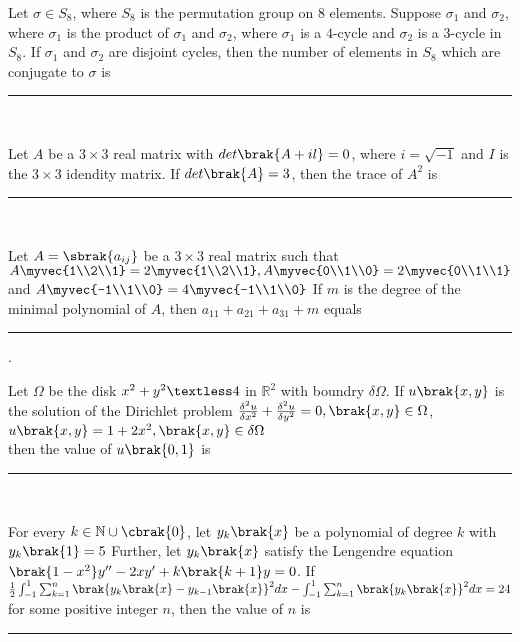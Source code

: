 \item{
Let $\sigma\in S_8$, where $S_8$ is the permutation group on $8$ elements. Suppose $\sigma_1$ and $\sigma_2$, where $\sigma_1$ is the product of $\sigma_1$ and $\sigma_2$, where $\sigma_1$ is a $4$-cycle and $\sigma_2$ is a $3$-cycle in $S_8$. If $\sigma_1$ and $\sigma_2$ are disjoint cycles, then the number of elements in $S_8$ which are conjugate to $\sigma$ is \rule{2cm}{0.15mm}\\
}
\item{
Let $A$ be a $3\times 3$ real matrix with $det\brak{A+il}=0$, where $i=\sqrt{-1}$ and $I$ is the $3\times 3$ idendity matrix. If $det\brak{A}=3$, then the trace of $A^2$ is\rule{2cm}{0.15mm}\\
}
\item{
Let $A=\sbrak{a_{ij}}$ be a $3\times 3$ real matrix such that $A\myvec{1\\2\\1}=2\myvec{1\\2\\1},A\myvec{0\\1\\0}=2\myvec{0\\1\\1}$ and $A\myvec{-1\\1\\0}=4\myvec{-1\\1\\0}$ If $m$ is the degree of the minimal polynomial of $A$, then $a_{11}+a_{21}+a_{31}+m$ equals\rule{2cm}{0.15mm}.\\
}
\item{
Let $\Omega$ be the disk $x^2+y^2\textless 4$ in $\mathbb{R}^2$ with boundry $\delta\Omega$. If $u\brak{x,y}$ is the solution of the Dirichlet problem $\frac{\delta^2u}{\delta x^2}+\frac{\delta^2u}{\delta y^2}=0,\brak{x,y}\in\Omega$,\\$u\brak{x,y}=1+2x^2,\brak{x,y}\in\delta\Omega$ \\then the value of $u\brak{0,1}$ is \rule{2cm}{0.15mm}\\ 
}
\item{
For every $k\in\mathbb{N}\cup\cbrak{0}$, let $y_k\brak{x}$ be a polynomial of degree $k$ with $y_k\brak{1}=5$ Further, let $y_k\brak{x}$ satisfy the Lengendre equation $\brak{1-x^2}y^{\prime\prime}-2xy^{\prime}+k\brak{k+1}y=0$. If $\frac{1}{2}\int_{-1}^1\sum_{k=1}^n\brak{y_k\brak{x}-y_{k-1}\brak{x}}^2dx-\int_{-1}^1\sum_{k=1}^n\brak{y_k\brak{x}}^2dx=24$ for some positive integer $n$, then the value of $n$ is \rule{2cm}{0.15mm}\\
}
